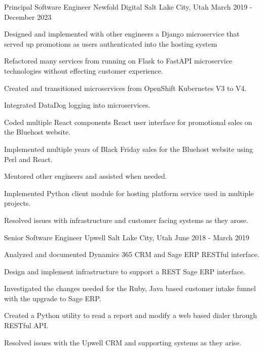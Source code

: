 \begin{cventries}
\cventry
{Principal Software Engineer} %
{Newfold Digital} %
{Salt Lake City, Utah} %
{March 2019 - December 2023} %
{
	\begin{cvitems} %
		\item {Designed and implemented with other engineers a Django microservice that served up promotions as users authenticated into the hosting system}
		\item {Refactored many services from running on Flask to FastAPI microservice technologies without effecting customer experience.}
		\item {Created and transitioned microservices from OpenShift Kubernetes V3 to V4.}
		\item {Integrated DataDog logging into microservices.}
		\item {Coded multiple React components React user interface for promotional sales on the Bluehost website.}
		\item {Implemented multiple years of Black Friday sales for the Bluehost website using Perl and React.}
		\item {Mentored other engineers and assisted when needed.}
		\item {Implemented Python client module for hosting platform service used in multiple projects.}
		\item {Resolved issues with infrastructure and customer facing systems as they arose.}
	\end{cvitems}
}

\cventry
{Senior Software Engineer} %
{Upwell} %
{Salt Lake City, Utah} %
{June 2018 - March 2019} %
{
	\begin{cvitems} %
		\item {Analyzed and documented Dynamics 365 CRM and Sage ERP RESTful interface.}
		\item {Design and implement infrastructure to support a REST Sage ERP interface.}
		\item {Investigated the changes needed for the Ruby, Java based customer intake funnel with the upgrade to Sage ERP.}
		\item {Created a Python utility to read a report and modify a web based dialer through RESTful API.}
		\item {Resolved issues with the Upwell CRM and supporting systems as they arise.}
	\end{cvitems}
}


\end{cventries}
